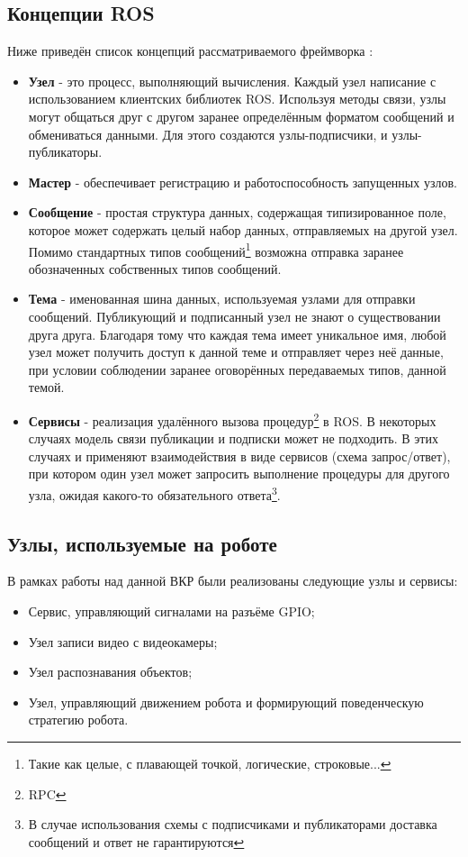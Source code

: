 \subsection{Концепции ROS}
Ниже приведён список концепций рассматриваемого фреймворка :
\begin{itemize}
\item {\textbf{Узел} - это процесс, выполняющий вычисления. Каждый узел написание с использованием клиентских библиотек ROS. Используя методы связи, узлы могут общаться друг с другом заранее определённым форматом сообщений и обмениваться данными. Для этого создаются узлы-подписчики, и узлы-публикаторы.}
\item {\textbf{Мастер} - обеспечивает регистрацию и работоспособность запущенных узлов.}
\item {\textbf{Сообщение} - простая структура данных, содержащая типизированное поле, которое может содержать целый набор данных, отправляемых на другой узел. Помимо стандартных типов сообщений\footnote{Такие как целые, с плавающей точкой, логические, строковые...} возможна отправка заранее обозначенных собственных типов сообщений.}
\item {\textbf{Тема} - именованная шина данных, используемая узлами для отправки сообщений. Публикующий и подписанный узел не знают о существовании друга друга. Благодаря тому что каждая тема имеет уникальное имя, любой узел может получить доступ к данной теме и отправляет через неё данные, при условии соблюдении заранее оговорённых передаваемых типов, данной темой.}
\item {\textbf{Сервисы} - реализация удалённого вызова процедур\footnote{RPC} в ROS. В некоторых случаях модель связи публикации и подписки может не подходить. В этих случаях и применяют взаимодействия в виде сервисов (схема запрос/ответ), при котором один узел может запросить выполнение процедуры для другого узла, ожидая какого-то обязательного ответа\footnote{В случае использования схемы с подписчиками и публикаторами доставка сообщений и ответ не гарантируются}.}
\end{itemize}

\subsection{Узлы, используемые на роботе}
В рамках работы над данной ВКР были реализованы следующие узлы и сервисы:
\begin{itemize}
\item Сервис, управляющий сигналами на разъёме GPIO; 
\item Узел записи видео с видеокамеры;
\item Узел распознавания объектов;
\item Узел, управляющий движением робота и формирующий поведенческую стратегию робота.
\end{itemize}

